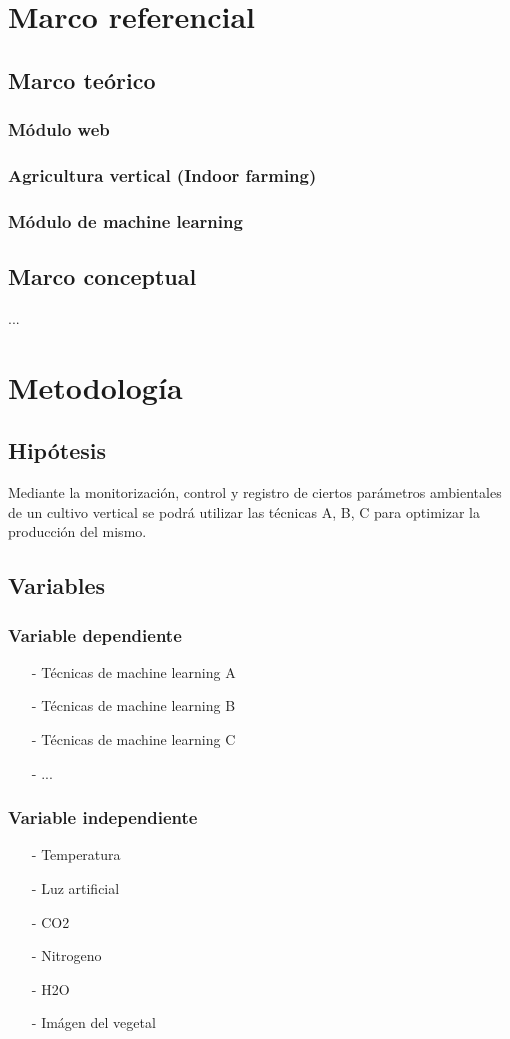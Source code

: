 \documentclass{report}
\begin{document}
\chapter{Marco referencial}
\section{Marco teórico}
\subsection{Módulo web}
\subsection{Agricultura vertical (Indoor farming)}
\subsection{Módulo de machine learning}
\section{Marco conceptual}
...
\chapter{Metodología}
\section{Hipótesis}
Mediante la monitorización, control y registro de ciertos parámetros ambientales de
un cultivo vertical se podrá utilizar las técnicas A, B, C para optimizar la
producción del mismo.
\section{Variables}
\subsection{Variable dependiente}
\begin{enumerate}
\item[-] Técnicas de machine learning A
\item[-] Técnicas de machine learning B
\item[-] Técnicas de machine learning C
\item[-] ...
\end{enumerate}
\subsection{Variable independiente}
\begin{enumerate}
\item[-] Temperatura
\item[-] Luz artificial
\item[-] CO2
\item[-] Nitrogeno
\item[-] H2O
\item[-] Imágen del vegetal
\end{enumerate}
\end{document}
